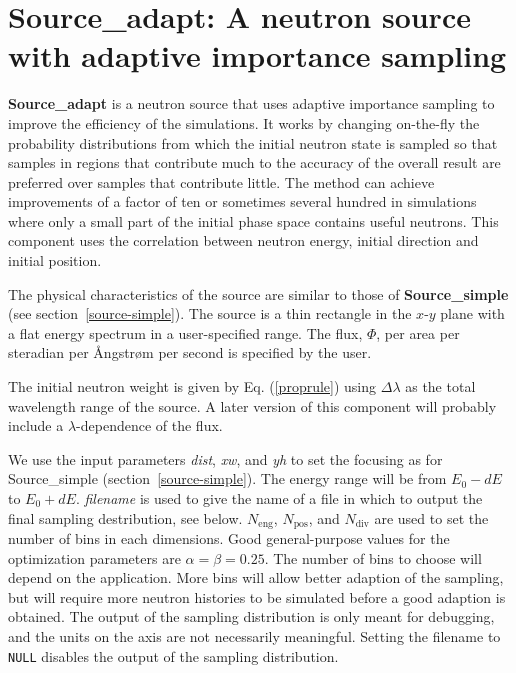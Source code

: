 \section{Source\_adapt: A neutron source with adaptive importance sampling}
\label{s:Source_adapt}
\label{s:source-adapt}


\textbf{Source\_adapt} is a neutron source that uses adaptive
importance sampling to improve the efficiency of the simulations. It
works by changing on-the-fly the probability distributions from which
the initial neutron state is sampled so that samples in regions that
contribute much to the accuracy of the overall result are preferred over
samples that contribute little. The method can achieve improvements of a
factor of ten or sometimes several hundred in simulations where only a
small part of the initial phase space contains useful neutrons.
This component uses the correlation between neutron energy,
initial direction and initial position.

The physical characteristics of the source are similar to those of
\textbf{Source\_simple} (see section~\ref{source-simple}). The source is a thin
rectangle in the $x$-$y$ plane with a flat energy spectrum in a
user-specified range. The flux, $\Phi$, per area per steradian per
{\AA}ngstr{\o}m per second is specified by the user.

The initial neutron weight is given by Eq. (\ref{proprule}) using
$\Delta\lambda$ as the total wavelength range of the source.
A later version of this component will probably include a
$\lambda$-dependence of the flux.

We use the input parameters \textit{dist}, \textit{xw}, and \textit{yh}
to set the focusing as for Source\_simple (section~\ref{source-simple}).
The energy range will be from $E_0 - dE$ to $E_0 + dE$.
\textit{filename} is used to give the name of a file in which to
output the final sampling destribution, see below.
$N_\textrm{eng}$, $N_\textrm{pos}$, and $N_\textrm{div}$
are used to set the number of bins in each dimensions.
Good general-purpose values for the optimization parameters are
$\alpha = \beta = 0.25$. The number of bins to choose will depend on the
application. More bins will allow better adaption of the sampling, but
will require more neutron histories to be simulated before a good
adaption is obtained. The output of the sampling distribution is only
meant for debugging, and the units on the axis are not necessarily
meaningful. Setting the filename to \verb+NULL+ disables the output of
the sampling distribution.

